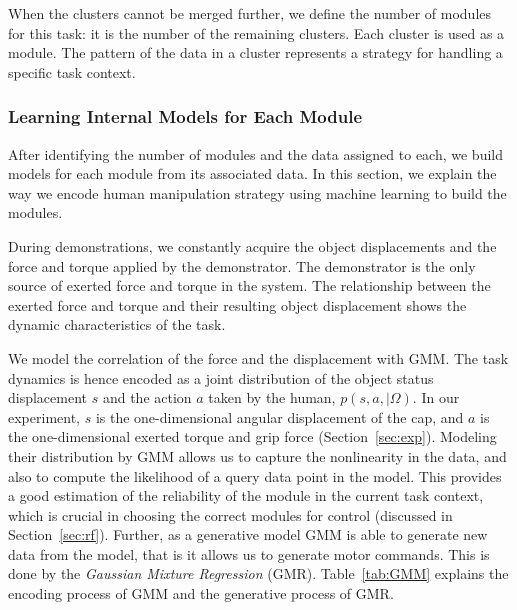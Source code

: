 When the clusters cannot be merged further, we define the number of
modules for this task: it is the number of the remaining
clusters. Each cluster is used as a module. The pattern of the data in
a cluster represents a strategy for handling a specific task context.

\subsubsection{Learning Internal Models for Each Module}
\label{sec:model}
After identifying the number of modules and the data assigned to each,
we build models for each module from its associated data. In this
section, we explain the way we encode human manipulation strategy
using machine learning to build the modules.

During demonstrations, we constantly acquire the object displacements
and the force and torque applied by the demonstrator. The demonstrator
is the only source of exerted force and torque in the system. The
relationship between the exerted force and torque and their resulting
object displacement shows the dynamic characteristics of the task.

We model the correlation of the force and the displacement with
GMM. The task dynamics is hence encoded as a joint distribution of the
object status displacement $s$ and the action $a$ taken by the human,
$p(s,a,{\mid}{\Omega})$. In our experiment, $s$ is the one-dimensional
angular displacement of the cap, and $a$ is the one-dimensional
exerted torque and grip force (Section~\ref{sec:exp}). Modeling their
distribution by GMM allows us to capture the nonlinearity in the data,
and also to compute the likelihood of a query data point in the
model. This provides a good estimation of the reliability of the
module in the current task context, which is crucial in choosing the
correct modules for control (discussed in
Section~\ref{sec:rf}). Further, as a generative model GMM is able to
generate new data from the model, that is it allows us to generate
motor commands. This is done by the {\em Gaussian Mixture Regression}
(GMR). Table~\ref{tab:GMM} explains the encoding process of GMM and
the generative process of GMR.  %

